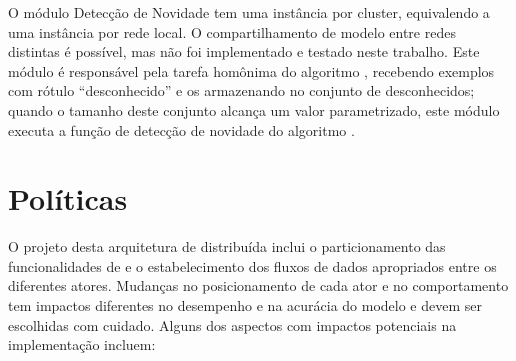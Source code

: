 O módulo Detecção de Novidade tem uma instância por cluster, equivalendo a uma
instância por rede local. O compartilhamento de modelo entre
redes distintas é possível, mas não foi implementado e testado neste trabalho.
% 
Este módulo é responsável pela tarefa homônima do algoritmo \minas, recebendo
exemplos com rótulo ``desconhecido'' e os armazenando no conjunto de
desconhecidos; quando o tamanho deste conjunto alcança um valor parametrizado,
este módulo executa a função de detecção de novidade do algoritmo \minas.

\section{Políticas}\label{sec:polices}

O projeto desta arquitetura de \nd distribuída inclui o particionamento das
funcionalidades de \minas e o estabelecimento dos fluxos de dados apropriados
entre os diferentes atores.
Mudanças no posicionamento de cada ator e no comportamento tem impactos
diferentes no desempenho e na acurácia do modelo e devem ser escolhidas com
cuidado.
% 
Alguns dos aspectos com impactos potenciais na implementação incluem:

